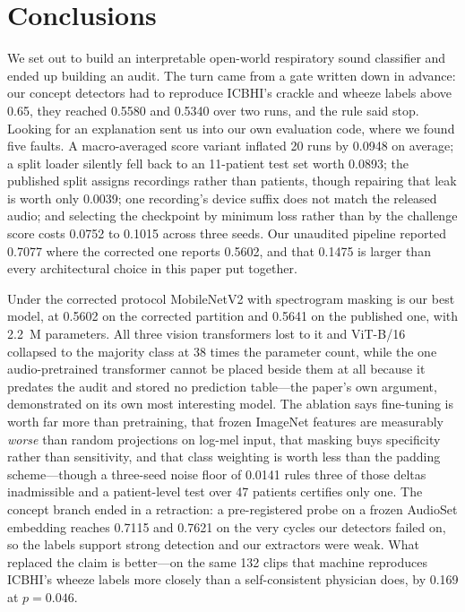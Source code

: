 \documentclass[journal,onecolumn]{IEEEtran}
\begin{document}
\section{Conclusions}
\label{sec:conclusion}

We set out to build an interpretable open-world respiratory sound classifier and ended up
building an audit. The turn came from a gate written down in advance: our concept detectors had
to reproduce ICBHI's crackle and wheeze labels above 0.65, they reached 0.5580 and 0.5340 over
two runs, and the rule said stop. Looking for an explanation sent us into our own evaluation
code, where we found five faults. A macro-averaged score variant inflated 20 runs by 0.0948 on
average; a split loader silently fell back to an 11-patient test set worth 0.0893; the published
split assigns recordings rather than patients, though repairing that leak is worth only 0.0039;
one recording's device suffix does not match the released audio; and selecting the checkpoint by
minimum loss rather than by the challenge score costs 0.0752 to 0.1015 across three seeds. Our
unaudited pipeline reported 0.7077 where the corrected one reports 0.5602, and that 0.1475 is
larger than every architectural choice in this paper put together.

Under the corrected protocol MobileNetV2 with spectrogram masking is our best model, at 0.5602
on the corrected partition and 0.5641 on the published one, with 2.2~M parameters. All three
vision transformers lost to it and ViT-B/16 collapsed to the majority class at 38 times the
parameter count, while the one audio-pretrained transformer cannot be placed beside them at all
because it predates the audit and stored no prediction table---the paper's own argument,
demonstrated on its own most interesting model. The ablation says fine-tuning is worth far more
than pretraining, that frozen ImageNet features are measurably \emph{worse} than random
projections on log-mel input, that masking buys specificity rather than sensitivity, and that
class weighting is worth less than the padding scheme---though a three-seed noise floor of
0.0141 rules three of those deltas inadmissible and a patient-level test over 47 patients
certifies only one. The concept branch ended in a retraction: a pre-registered probe on a frozen
AudioSet embedding reaches 0.7115 and 0.7621 on the very cycles our detectors failed on, so the
labels support strong detection and our extractors were weak. What replaced the claim is
better---on the same 132 clips that machine reproduces ICBHI's wheeze labels more closely than a
self-consistent physician does, by 0.169 at $p = 0.046$.
\end{document}
